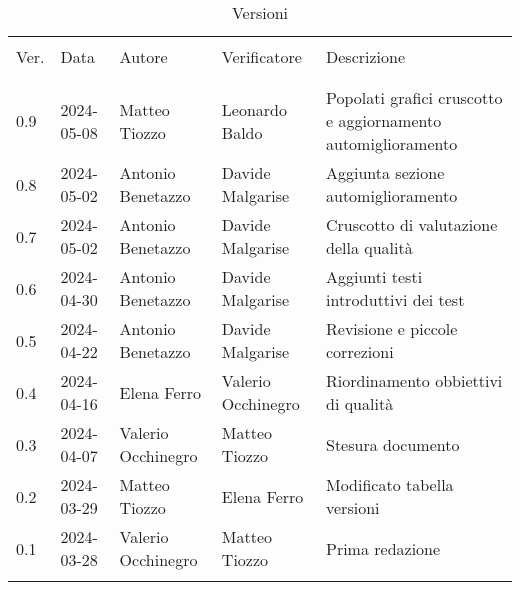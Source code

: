 \documentclass[italian,12pt]{article} %
\begin{document}

\newpage

\captionsetup[table]{list=no}
\begin{table}[!h]
	\caption*{Versioni}
	\footnotesize
	\begin{center}
		\begin{tabular}{ l l l l p{6cm} }
			\hline                                                                                                                     \\[-2ex]
			Ver. & Data       & Autore             & Verificatore       & Descrizione                                                  \\
			\\[-2ex] \hline \\[-1.5ex]
			0.9  & 2024-05-08 & Matteo Tiozzo      & Leonardo Baldo     & Popolati grafici cruscotto e aggiornamento automiglioramento \\
			0.8  & 2024-05-02 & Antonio Benetazzo  & Davide Malgarise   & Aggiunta sezione automiglioramento                           \\
			0.7  & 2024-05-02 & Antonio Benetazzo  & Davide Malgarise   & Cruscotto di valutazione della qualità                       \\
			0.6  & 2024-04-30 & Antonio Benetazzo  & Davide Malgarise   & Aggiunti testi introduttivi dei test                         \\
			0.5  & 2024-04-22 & Antonio Benetazzo  & Davide Malgarise   & Revisione e piccole correzioni                               \\
			0.4  & 2024-04-16 & Elena Ferro        & Valerio Occhinegro & Riordinamento obbiettivi di qualità                          \\
			0.3  & 2024-04-07 & Valerio Occhinegro & Matteo Tiozzo      & Stesura documento                                            \\
			0.2  & 2024-03-29 & Matteo Tiozzo      & Elena Ferro        & Modificato tabella versioni                                  \\
			0.1  & 2024-03-28 & Valerio Occhinegro & Matteo Tiozzo      & Prima redazione                                              \\
			\\[-1.5ex] \hline
		\end{tabular}
	\end{center}
\end{table}
\captionsetup[table]{list=yes}
\newpage
\tableofcontents
\listoftables
\listoffigures
\newpage





\end{document}
